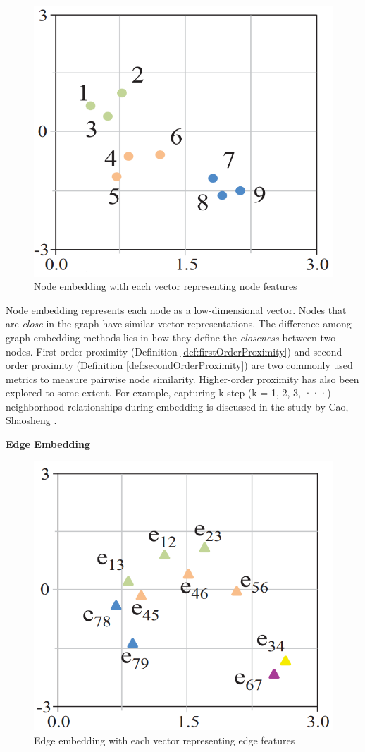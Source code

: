 \begin{figure}[htp]
	\centering
	\includegraphics[width=7 cm]{images/graph_emb_2.png}
	\caption{
		Node embedding with each vector representing node features}
	\label{fig:nodeEmbedding}
\end{figure}

Node embedding represents each node as a low-dimensional vector. Nodes that are \textit{close} in the graph have similar vector representations. The difference among graph embedding methods lies in how they define the \textit{closeness} between two nodes. First-order proximity (Definition \ref{def:firstOrderProximity}) and second-order proximity (Definition \ref{def:secondOrderProximity}) are two commonly used metrics to measure pairwise node similarity. Higher-order proximity has also been explored to some extent. For example, capturing k-step (k = 1, 2, 3, ···) neighborhood relationships during embedding is discussed in the study by Cao, Shaosheng \cite{cao2015grarep}.

\textbf{Edge Embedding}
\label{sec:edgeEmbedding}

\begin{figure}[htp]
	\centering
	\includegraphics[width=7 cm]{images/graph_emb_3.png}
	\caption{Edge embedding with each vector representing edge features}
	\label{fig:edgeEmbedding}
\end{figure}

